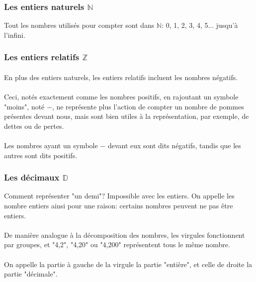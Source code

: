 \documentclass[a4paper]{book}
\begin{document}
    \subsubsection{Les entiers naturels $\mathds{N}$}
    Tout les nombres utilisés pour compter sont dans $\mathds{N}$: 0, 1, 2, 3, 4, 5... jusqu'à l'infini.
    
    \subsubsection{Les entiers relatifs $\mathds{Z}$}
    \paragraph{}
    En plus des entiers naturels, les entiers relatifs incluent les nombres négatifs. 
    \paragraph{}
    Ceci, notés exactement comme les nombres positifs, en rajoutant un symbole "moins", noté $-$, ne représente plus l'action de compter un nombre de pommes présentes devant nous, mais sont bien utiles à la représentation, par exemple, de dettes ou de pertes.

    \paragraph{}
    Les nombres ayant un symbole $-$ devant eux sont dits négatifs, tandis que les autres sont dits positifs.
    
    \subsubsection{Les décimaux $\mathds{D}$}
    Comment représenter "un demi"? Impossible avec les entiers. On appelle les nombre entiers ainsi pour une raison: certains nombres peuvent ne pas être entiers. 
    \paragraph{}
    De manière analogue à la décomposition des nombres, les virgules fonctionnent par groupes, et "4,2", "4,20" ou "4,200" représentent tous le même nombre.
    \paragraph{}
    On appelle la partie à gauche de la virgule la partie "entière", et celle de droite la partie "décimale".
\end{document}
